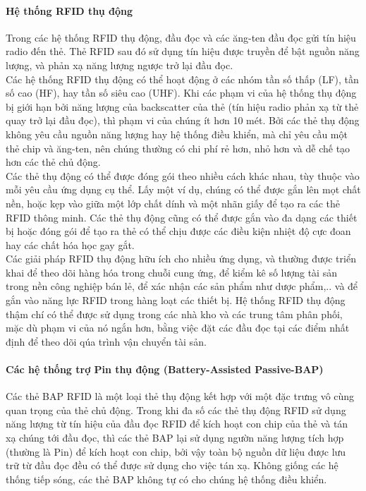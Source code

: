 \paragraph{Hệ thống RFID thụ động}
Trong các hệ thống RFID thụ động,  đầu đọc và các ăng-ten đầu đọc gửi tín hiệu radio đến thẻ. Thẻ RFID sau đó sử dụng tín hiệu được truyền để bật nguồn năng lượng,  và phản xạ năng lượng ngược trở lại đầu đọc.\\
Các hệ thống RFID thụ động có thể hoạt động ở các nhóm  tần số thấp (LF), tần số cao (HF), hay tần số siêu cao (UHF). Khi các phạm vi của hệ thống thụ động bị giới hạn bởi năng lượng của backscatter của thẻ (tín hiệu radio phản xạ từ thẻ quay trở lại đầu đọc), thì phạm vi của chúng ít hơn 10 mét. Bởi các thẻ thụ động không yêu cầu nguồn năng lượng hay hệ thống điều khiển, mà chỉ yêu cầu một thẻ chip và ăng-ten, nên chúng thường có chi phí rẻ hơn, nhỏ hơn và dễ chế tạo hơn các thẻ chủ động.\\
Các thẻ thụ động có thể được đóng gói theo nhiều cách khác nhau, tùy thuộc vào mỗi yêu cầu ứng dụng cụ thể. Lấy một ví dụ, chúng có thể được gắn lên mọt chất nền,  hoặc kẹp vào giữa một lớp chất dính và một nhãn giấy để tạo ra các thẻ RFID thông minh. Các thẻ thụ động cũng có thể được gắn vào đa dạng các thiết bị hoặc đóng gói để tạo ra thẻ có thể chịu được các điều kiện nhiệt độ cực đoan hay các chất hóa học gay gắt.\\
Các giải pháp RFID thụ động hữu ích cho nhiều ứng dụng, và thường được triển khai để theo dõi hàng hóa trong chuỗi cung ứng, để kiểm kê số lượng tài sản trong nền công nghiệp bán lẻ, để xác nhận các sản phẩm như dược phẩm,.. và để gắn vào năng lực RFID trong hàng loạt các thiết bị. Hệ thống RFID thụ động thậm chí có thể được sử dụng trong các nhà kho và các trung tâm phân phối, mặc dù phạm vi của nó ngắn hơn, bằng việc đặt các đầu đọc tại các điểm nhất định để theo dõi qúa trình vận chuyển tài sản.
\paragraph{Các hệ thống trợ Pin thụ động (Battery-Assisted Passive-BAP)}
Các thẻ BAP RFID là một loại thẻ thụ động  kết hợp với một đặc trưng vô cùng quan trọng của thẻ chủ động. Trong khi đa số các thẻ thụ động RFID sử dụng năng lượng từ tín hiệu của đầu đọc RFID để kích hoạt con chip của thẻ và tán xạ chúng tới đầu đọc, thì  các thẻ BAP lại sử dụng ngườn năng lượng tích hợp (thường là Pin) để kích hoạt con chip, bởi vậy toàn bộ nguồn dữ liệu được lưu trữ từ đầu đọc đều có thể được sử dụng cho việc tán xạ. Không giống các hệ thống tiếp sóng,  các thẻ BAP không tự có cho chúng hệ thống điều khiển.
\label{ref{fig2_8}}
